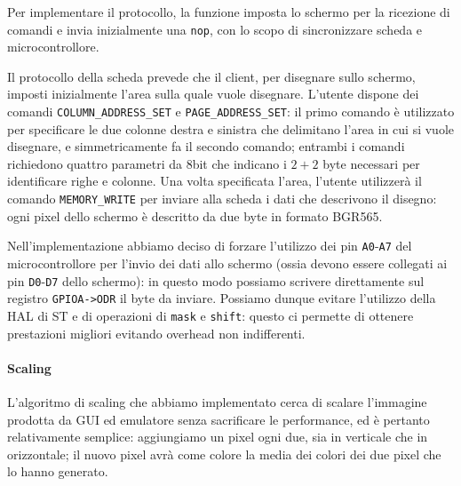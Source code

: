 \documentclass[hidelinks,12pt]{article}
\begin{document}
Per implementare il protocollo, la funzione imposta lo schermo per
la ricezione di comandi e invia inizialmente una \texttt{nop}, con lo scopo di
sincronizzare scheda e microcontrollore.

Il protocollo della scheda prevede che il client, per disegnare sullo schermo,
imposti inizialmente l'area sulla quale vuole disegnare.
L'utente dispone dei comandi \texttt{COLUMN\_ADDRESS\_SET} e
\texttt{PAGE\_ADDRESS\_SET}: il primo comando è utilizzato per specificare le
due colonne destra e sinistra che delimitano l'area in cui si vuole disegnare, e
simmetricamente fa il secondo comando; entrambi i comandi richiedono quattro
parametri da $8$bit che indicano i $2+2$ byte necessari per identificare righe e
colonne. Una volta specificata l'area, l'utente utilizzerà il comando
\texttt{MEMORY\_WRITE} per inviare alla scheda i dati che descrivono il disegno:
ogni pixel dello schermo è descritto da due byte in formato BGR565.

Nell'implementazione abbiamo deciso di forzare l'utilizzo dei pin
\texttt{A0}-\texttt{A7} del microcontrollore per l'invio dei dati allo schermo
(ossia devono essere collegati ai pin \texttt{D0}-\texttt{D7} dello schermo): in
questo modo possiamo scrivere direttamente sul registro \texttt{GPIOA->ODR} il
byte da inviare. Possiamo dunque evitare l'utilizzo della HAL di ST e di
operazioni di \texttt{mask} e \texttt{shift}: questo ci permette di ottenere
prestazioni migliori evitando overhead non indifferenti.

\paragraph{Scaling}
L'algoritmo di scaling che abbiamo implementato cerca di scalare l'immagine
prodotta da GUI ed emulatore senza sacrificare le performance, ed è pertanto
relativamente semplice: aggiungiamo un pixel ogni due, sia in verticale che in
orizzontale; il nuovo pixel avrà come colore la media dei colori dei due pixel
che lo hanno generato.
\end{document}
